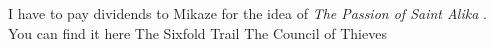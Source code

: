 I have to pay dividends to Mikaze for the idea of {\itshape The Passion of Saint Alika} . You can find it here The Sixfold Trail The Council of Thieves 